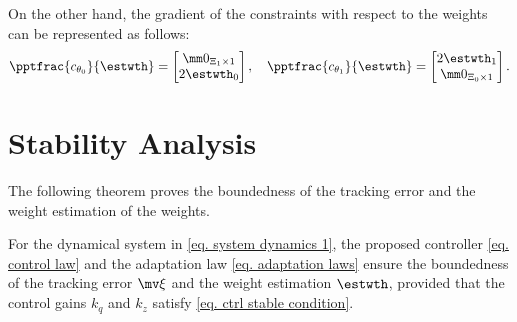 \documentclass[letterpaper, 10 pt, conference]{ieeeconf}  %
\begin{document}
On the other hand, the gradient of the constraints with respect to the weights can be represented as follows:
\begin{equation}
    \pptfrac{c_{\theta_0}}{{\estwth}}
    = 
    \begin{bmatrix}
        \mm 0_{\Xi_1\times 1} \\
        2{\estwth}_0 
    \end{bmatrix}
    ,\quad
    \pptfrac{c_{\theta_1}}{{\estwth}}    
    = 
    \begin{bmatrix}
        2{\estwth}_1 \\
        \mm 0_{\Xi_0\times 1}
    \end{bmatrix}
    .
\end{equation}

\section{Stability Analysis}\label{sec:stability}

The following theorem proves the boundedness of the tracking error and the weight estimation of the weights.

\begin{theorem}
For the dynamical system in \eqref{eq. system dynamics 1}, the proposed controller \eqref{eq. control law} and the adaptation law \eqref{eq. adaptation laws} ensure the boundedness of the tracking error $\mv \xi$ and the weight estimation ${\estwth}$, provided that the control gains ${k_q}$ and ${k_z}$ satisfy \eqref{eq. ctrl stable condition}.
\end{theorem}
\end{document}
